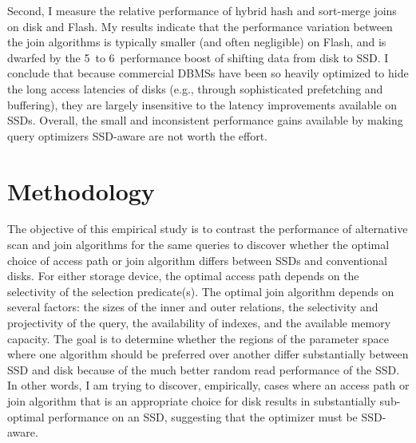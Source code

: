 Second, I measure the relative performance of hybrid hash and sort-merge joins on disk and Flash.
My results indicate that the performance variation between the join algorithms is typically smaller (and often negligible) on Flash, and is dwarfed by the 5\texttimes~to 6\texttimes~performance boost of shifting data from disk to SSD.
 I conclude that because commercial DBMSs have been so heavily optimized to hide the long access latencies of disks (e.g., through sophisticated prefetching and buffering), they are largely insensitive to the latency improvements available on SSDs.
Overall, the small and inconsistent performance gains available by making query optimizers SSD-aware are not worth the effort.

\section{Methodology}
\label{sec:FlashOpti:Methodology}
The objective of this empirical study is to contrast the performance of alternative scan and join algorithms for the same queries to discover whether the optimal choice of access path or join algorithm differs between SSDs and conventional disks.
For either storage device, the optimal access path depends on the selectivity of the selection predicate(s).
The optimal join algorithm depends on several factors: the sizes of the inner and outer relations, the selectivity and projectivity of the query, the availability of indexes, and the available memory capacity.
The goal is to determine whether the regions of the parameter space where one algorithm should be preferred over another differ substantially between SSD and disk because of the much better random read performance of the SSD.
In other words, I am trying to discover, empirically, cases where an access path or join algorithm that is an appropriate choice for disk results in substantially sub-optimal performance on an SSD, suggesting that the optimizer must be SSD-aware.

